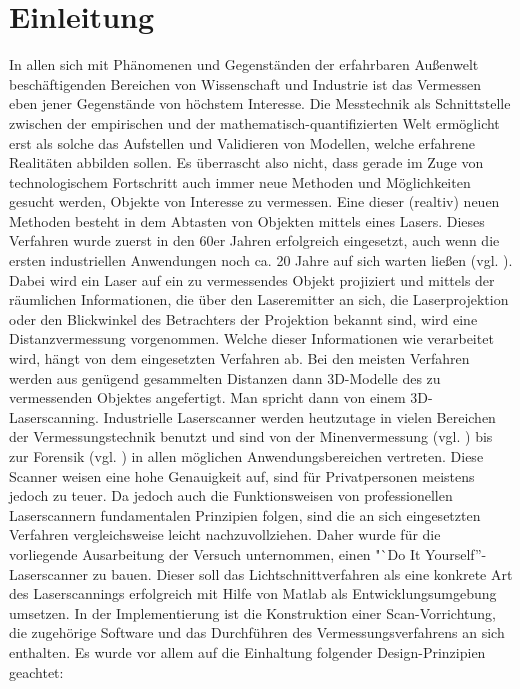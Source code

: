 \chapter{Einleitung}
\label{chap:Einleitung}
In allen sich mit Phänomenen und Gegenständen der erfahrbaren Außenwelt beschäftigenden Bereichen von Wissenschaft und Industrie ist das Vermessen eben jener Gegenstände von höchstem Interesse. Die Messtechnik als Schnittstelle zwischen der empirischen und der mathematisch-quantifizierten Welt ermöglicht erst als solche das Aufstellen und Validieren von Modellen, welche erfahrene Realitäten abbilden sollen. Es überrascht also nicht, dass gerade im Zuge von technologischem Fortschritt auch immer neue Methoden und Möglichkeiten gesucht werden, Objekte von Interesse zu vermessen. \newline
Eine dieser (realtiv) neuen Methoden besteht in dem Abtasten von Objekten mittels eines Lasers. Dieses Verfahren wurde zuerst in den 60er Jahren erfolgreich eingesetzt, auch wenn die ersten industriellen Anwendungen noch ca. 20 Jahre auf sich warten ließen (vgl. \cite{Ebrahim:11}). Dabei wird ein Laser auf ein zu vermessendes Objekt projiziert und mittels der räumlichen Informationen, die über den Laseremitter an sich, die Laserprojektion oder den Blickwinkel des Betrachters der Projektion bekannt sind, wird eine Distanzvermessung vorgenommen. Welche dieser Informationen wie verarbeitet wird, hängt von dem eingesetzten Verfahren ab. Bei den meisten Verfahren werden aus genügend gesammelten Distanzen dann 3D-Modelle des zu vermessenden Objektes angefertigt. Man spricht dann von einem 3D-Laserscanning. \newline
Industrielle Laserscanner werden heutzutage in vielen Bereichen der Vermessungstechnik benutzt und sind von der Minenvermessung (vgl. \cite{riegl:17}) bis zur Forensik (vgl. \cite{Zoller:16}) in allen möglichen Anwendungsbereichen vertreten. Diese Scanner weisen eine hohe Genauigkeit auf, sind für Privatpersonen meistens jedoch zu teuer. Da jedoch auch die Funktionsweisen von professionellen Laserscannern fundamentalen Prinzipien folgen, sind die an sich eingesetzten Verfahren vergleichsweise leicht nachzuvollziehen. Daher wurde für die vorliegende Ausarbeitung der Versuch unternommen, einen "`Do It Yourself''-Laserscanner zu bauen. Dieser soll das Lichtschnittverfahren als eine konkrete Art des Laserscannings erfolgreich mit Hilfe von Matlab als Entwicklungsumgebung umsetzen. In der Implementierung ist die Konstruktion einer Scan-Vorrichtung, die zugehörige Software und das Durchführen des Vermessungsverfahrens an sich enthalten. Es wurde vor allem auf die Einhaltung folgender Design-Prinzipien geachtet:
